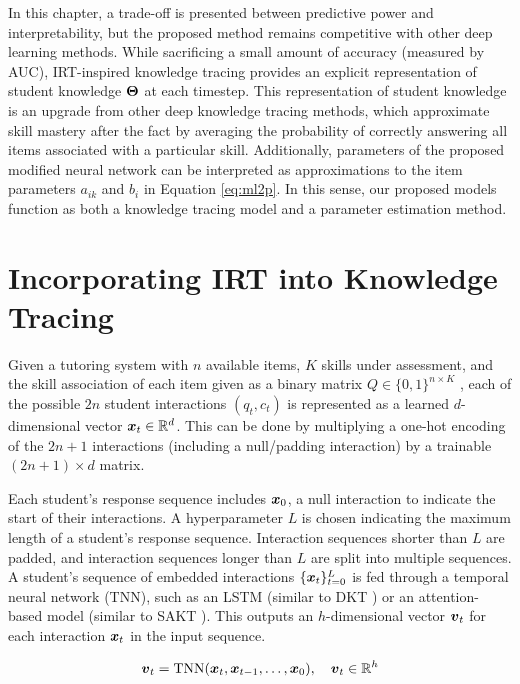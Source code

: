 In this chapter, a trade-off is presented between predictive power and interpretability, but the proposed method remains competitive with other deep learning methods. While sacrificing a small amount of accuracy (measured by AUC), IRT-inspired knowledge tracing provides an explicit representation of student knowledge $\boldsymbol{\Theta}$ at each timestep. This representation of student knowledge is an upgrade from other deep knowledge tracing methods, which approximate skill mastery after the fact by averaging the probability of correctly answering all items associated with a particular skill. Additionally, parameters of the proposed modified neural network can be interpreted as approximations to the item parameters $a_{ik}$ and $b_i$ in Equation \ref{eq:ml2p}. In this sense, our proposed models function as both a knowledge tracing model and a parameter estimation method.


\section{Incorporating IRT into Knowledge Tracing} \label{sec:kt_irt_methods}
Given a tutoring system with $n$ available items, $K$ skills under assessment, and the skill association of each item given as a binary matrix $Q \in \{0,1\}^{n \times K}$ \cite{daSilva2018}, each of the possible $2n$ student interactions $(q_t, c_t)$ is represented as a learned $d$-dimensional vector $\boldsymbol{x}_t \in \mathbb{R}^d$. This can be done by multiplying a one-hot encoding of the $2n+1$ interactions (including a null/padding interaction) by a trainable $(2n+1) \times d$ matrix.

Each student's response sequence includes $\boldsymbol{x}_0$, a null interaction to indicate the start of their interactions. A hyperparameter $L$ is chosen indicating the maximum length of a student's response sequence. Interaction sequences shorter than $L$ are padded, and interaction sequences longer than $L$ are split into multiple sequences. A student's sequence of embedded interactions $\{\boldsymbol{x}_t\}_{t=0}^L$ is fed through a temporal neural network (TNN), such as an LSTM (similar to DKT \cite{piech2015}) or an attention-based model (similar to SAKT \cite{pandey2019}). This outputs an $h$-dimensional vector $\boldsymbol{v}_t$ for each interaction $\boldsymbol{x}_t$ in the input sequence.

\begin{equation}
  \boldsymbol{v}_t = \text{TNN}(\boldsymbol{x}_t, \boldsymbol{x}_{t-1}, \ldots, \boldsymbol{x}_0), \quad \boldsymbol{v}_t \in \mathbb{R}^h
  \label{eq:tsnn_layer}
\end{equation}

